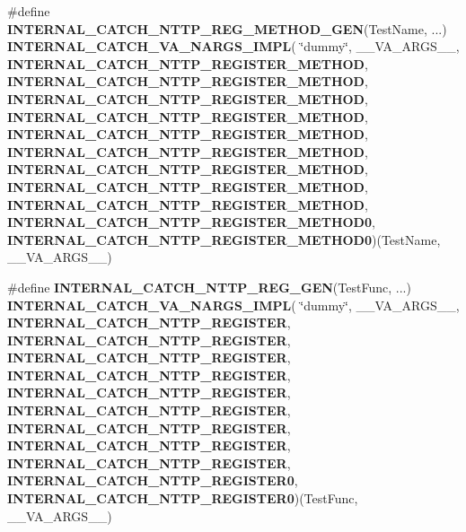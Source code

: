 \begin{DoxyCompactItemize}
\#define \textbf{ I\+N\+T\+E\+R\+N\+A\+L\+\_\+\+C\+A\+T\+C\+H\+\_\+\+N\+T\+T\+P\+\_\+\+R\+E\+G\+\_\+\+M\+E\+T\+H\+O\+D\+\_\+\+G\+EN}(Test\+Name, ...)~\textbf{ I\+N\+T\+E\+R\+N\+A\+L\+\_\+\+C\+A\+T\+C\+H\+\_\+\+V\+A\+\_\+\+N\+A\+R\+G\+S\+\_\+\+I\+M\+PL}( \char`\"{}dummy\char`\"{}, \+\_\+\+\_\+\+V\+A\+\_\+\+A\+R\+G\+S\+\_\+\+\_\+, \textbf{ I\+N\+T\+E\+R\+N\+A\+L\+\_\+\+C\+A\+T\+C\+H\+\_\+\+N\+T\+T\+P\+\_\+\+R\+E\+G\+I\+S\+T\+E\+R\+\_\+\+M\+E\+T\+H\+OD}, \textbf{ I\+N\+T\+E\+R\+N\+A\+L\+\_\+\+C\+A\+T\+C\+H\+\_\+\+N\+T\+T\+P\+\_\+\+R\+E\+G\+I\+S\+T\+E\+R\+\_\+\+M\+E\+T\+H\+OD}, \textbf{ I\+N\+T\+E\+R\+N\+A\+L\+\_\+\+C\+A\+T\+C\+H\+\_\+\+N\+T\+T\+P\+\_\+\+R\+E\+G\+I\+S\+T\+E\+R\+\_\+\+M\+E\+T\+H\+OD}, \textbf{ I\+N\+T\+E\+R\+N\+A\+L\+\_\+\+C\+A\+T\+C\+H\+\_\+\+N\+T\+T\+P\+\_\+\+R\+E\+G\+I\+S\+T\+E\+R\+\_\+\+M\+E\+T\+H\+OD}, \textbf{ I\+N\+T\+E\+R\+N\+A\+L\+\_\+\+C\+A\+T\+C\+H\+\_\+\+N\+T\+T\+P\+\_\+\+R\+E\+G\+I\+S\+T\+E\+R\+\_\+\+M\+E\+T\+H\+OD}, \textbf{ I\+N\+T\+E\+R\+N\+A\+L\+\_\+\+C\+A\+T\+C\+H\+\_\+\+N\+T\+T\+P\+\_\+\+R\+E\+G\+I\+S\+T\+E\+R\+\_\+\+M\+E\+T\+H\+OD}, \textbf{ I\+N\+T\+E\+R\+N\+A\+L\+\_\+\+C\+A\+T\+C\+H\+\_\+\+N\+T\+T\+P\+\_\+\+R\+E\+G\+I\+S\+T\+E\+R\+\_\+\+M\+E\+T\+H\+OD}, \textbf{ I\+N\+T\+E\+R\+N\+A\+L\+\_\+\+C\+A\+T\+C\+H\+\_\+\+N\+T\+T\+P\+\_\+\+R\+E\+G\+I\+S\+T\+E\+R\+\_\+\+M\+E\+T\+H\+OD}, \textbf{ I\+N\+T\+E\+R\+N\+A\+L\+\_\+\+C\+A\+T\+C\+H\+\_\+\+N\+T\+T\+P\+\_\+\+R\+E\+G\+I\+S\+T\+E\+R\+\_\+\+M\+E\+T\+H\+OD}, \textbf{ I\+N\+T\+E\+R\+N\+A\+L\+\_\+\+C\+A\+T\+C\+H\+\_\+\+N\+T\+T\+P\+\_\+\+R\+E\+G\+I\+S\+T\+E\+R\+\_\+\+M\+E\+T\+H\+O\+D0}, \textbf{ I\+N\+T\+E\+R\+N\+A\+L\+\_\+\+C\+A\+T\+C\+H\+\_\+\+N\+T\+T\+P\+\_\+\+R\+E\+G\+I\+S\+T\+E\+R\+\_\+\+M\+E\+T\+H\+O\+D0})(Test\+Name, \+\_\+\+\_\+\+V\+A\+\_\+\+A\+R\+G\+S\+\_\+\+\_\+)
\item 
\#define \textbf{ I\+N\+T\+E\+R\+N\+A\+L\+\_\+\+C\+A\+T\+C\+H\+\_\+\+N\+T\+T\+P\+\_\+\+R\+E\+G\+\_\+\+G\+EN}(Test\+Func, ...)~\textbf{ I\+N\+T\+E\+R\+N\+A\+L\+\_\+\+C\+A\+T\+C\+H\+\_\+\+V\+A\+\_\+\+N\+A\+R\+G\+S\+\_\+\+I\+M\+PL}( \char`\"{}dummy\char`\"{}, \+\_\+\+\_\+\+V\+A\+\_\+\+A\+R\+G\+S\+\_\+\+\_\+, \textbf{ I\+N\+T\+E\+R\+N\+A\+L\+\_\+\+C\+A\+T\+C\+H\+\_\+\+N\+T\+T\+P\+\_\+\+R\+E\+G\+I\+S\+T\+ER}, \textbf{ I\+N\+T\+E\+R\+N\+A\+L\+\_\+\+C\+A\+T\+C\+H\+\_\+\+N\+T\+T\+P\+\_\+\+R\+E\+G\+I\+S\+T\+ER}, \textbf{ I\+N\+T\+E\+R\+N\+A\+L\+\_\+\+C\+A\+T\+C\+H\+\_\+\+N\+T\+T\+P\+\_\+\+R\+E\+G\+I\+S\+T\+ER}, \textbf{ I\+N\+T\+E\+R\+N\+A\+L\+\_\+\+C\+A\+T\+C\+H\+\_\+\+N\+T\+T\+P\+\_\+\+R\+E\+G\+I\+S\+T\+ER}, \textbf{ I\+N\+T\+E\+R\+N\+A\+L\+\_\+\+C\+A\+T\+C\+H\+\_\+\+N\+T\+T\+P\+\_\+\+R\+E\+G\+I\+S\+T\+ER}, \textbf{ I\+N\+T\+E\+R\+N\+A\+L\+\_\+\+C\+A\+T\+C\+H\+\_\+\+N\+T\+T\+P\+\_\+\+R\+E\+G\+I\+S\+T\+ER}, \textbf{ I\+N\+T\+E\+R\+N\+A\+L\+\_\+\+C\+A\+T\+C\+H\+\_\+\+N\+T\+T\+P\+\_\+\+R\+E\+G\+I\+S\+T\+ER}, \textbf{ I\+N\+T\+E\+R\+N\+A\+L\+\_\+\+C\+A\+T\+C\+H\+\_\+\+N\+T\+T\+P\+\_\+\+R\+E\+G\+I\+S\+T\+ER}, \textbf{ I\+N\+T\+E\+R\+N\+A\+L\+\_\+\+C\+A\+T\+C\+H\+\_\+\+N\+T\+T\+P\+\_\+\+R\+E\+G\+I\+S\+T\+ER}, \textbf{ I\+N\+T\+E\+R\+N\+A\+L\+\_\+\+C\+A\+T\+C\+H\+\_\+\+N\+T\+T\+P\+\_\+\+R\+E\+G\+I\+S\+T\+E\+R0}, \textbf{ I\+N\+T\+E\+R\+N\+A\+L\+\_\+\+C\+A\+T\+C\+H\+\_\+\+N\+T\+T\+P\+\_\+\+R\+E\+G\+I\+S\+T\+E\+R0})(Test\+Func, \+\_\+\+\_\+\+V\+A\+\_\+\+A\+R\+G\+S\+\_\+\+\_\+)

\end{DoxyCompactItemize}
